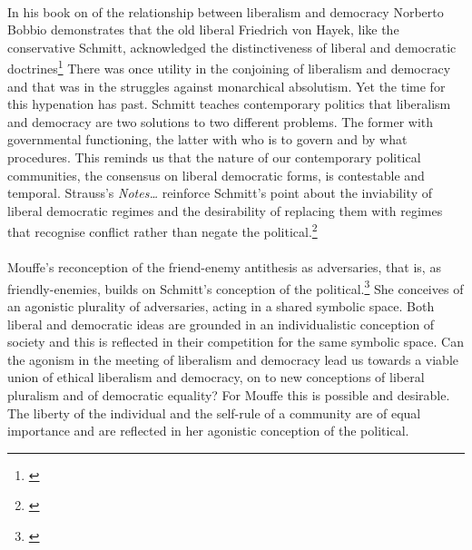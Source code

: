 \documentclass[12pt,a4paper,titlepage]{article}
\begin{document}
\paragraph{}In his book on of the relationship between liberalism and democracy Norberto Bobbio demonstrates that the old liberal Friedrich von Hayek, like the conservative Schmitt, acknowledged the distinctiveness of liberal and democratic doctrines\footnote{\cite[p.81]{Bobbio:2005vn}} There was once utility in the conjoining of liberalism and democracy and that was in the struggles against monarchical absolutism. Yet the time for this hypenation has past. Schmitt teaches contemporary politics that liberalism and democracy are two solutions to two different problems. The former with governmental functioning, the latter with who is to govern and by what procedures. This reminds us that the nature of our contemporary political communities, the consensus on liberal democratic forms, is contestable and temporal.  Strauss's \emph{Notes\ldots} reinforce Schmitt's point about the inviability of liberal democratic regimes and the desirability of replacing them with regimes that recognise conflict rather than negate the political.\footnote{\cite[Notes 5 \& 6]{Strauss:2007ncp}}

\paragraph{}Mouffe's reconception of the friend-enemy antithesis as adversaries, that is, as friendly-enemies, builds on Schmitt's conception of the political.\footnote{\cite[esp Ch.2 \& 4]{Mouffe:2000fk}} She conceives of an agonistic plurality of adversaries, acting in a shared symbolic space. Both liberal and democratic ideas are grounded in an individualistic conception of society and this is reflected in their competition for the same symbolic space. Can the agonism in the meeting of liberalism and democracy lead us towards a viable union of ethical liberalism and democracy, on to new conceptions of liberal pluralism and of democratic equality? For Mouffe this is possible and desirable. The liberty of the individual and the self-rule of a community are of equal importance and are reflected in her agonistic conception of the political.
\newpage
\singlespacing
{}

\end{document}
